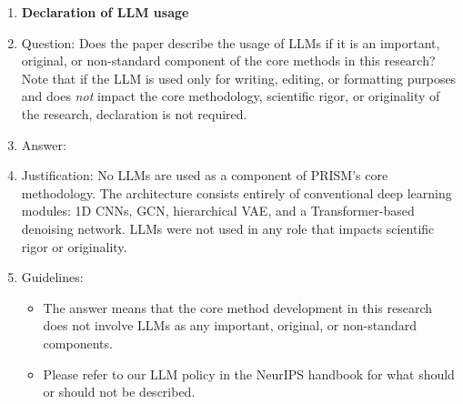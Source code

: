 \begin{enumerate}
\item {\bf Declaration of LLM usage}
    \item[] Question: Does the paper describe the usage of LLMs if it is an important, original, or non-standard component of the core methods in this research? Note that if the LLM is used only for writing, editing, or formatting purposes and does \emph{not} impact the core methodology, scientific rigor, or originality of the research, declaration is not required.
    \item[] Answer: \answerNA{}
    \item[] Justification: No LLMs are used as a component of PRISM's core methodology. The architecture consists entirely of conventional deep learning modules: 1D CNNs, GCN, hierarchical VAE, and a Transformer-based denoising network. LLMs were not used in any role that impacts scientific rigor or originality.
    \item[] Guidelines:
    \begin{itemize}
        \item The answer \answerNA{} means that the core method development in this research does not involve LLMs as any important, original, or non-standard components.
        \item Please refer to our LLM policy in the NeurIPS handbook for what should or should not be described.
    \end{itemize}

\end{enumerate}

